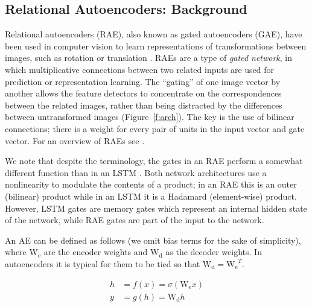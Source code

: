 \documentclass[11pt]{article}
\begin{document}
\subsection{Relational Autoencoders: Background}

Relational autoencoders (RAE), also known as gated autoencoders (GAE),
have been used in computer vision to learn representations of
transformations between images, such as rotation or translation \citep{memisevic:07,memisevic:12,memisevic:13}. RAEs
are a type of {\it gated network}, in which multiplicative connections
between two related inputs are used for prediction or representation
learning. The ``gating'' of one image vector by another allows the feature detectors to concentrate on the correspondences between the related images, rather than being distracted by the differences between untransformed images (Figure~\ref{f:arch}). The key is the use of bilinear connections; there is a weight for every pair of units in the input vector and gate vector. For an overview of RAEs see \citet{memisevic:13,sigaud:15}.

We note that despite the terminology, the gates in an RAE perform a somewhat different function than in an LSTM \citep{lstm}. Both network architectures use a nonlinearity to modulate the contents of a product; in an RAE this is an outer (bilinear) product while in an LSTM it is a Hadamard (element-wise) product. However, LSTM gates are memory gates which represent an internal hidden state of the network, while RAE gates are part of the input to the network.

An AE can be defined as follows (we omit bias terms for the sake of simplicity), where $\mathrm{W_e}$ are the encoder weights and $\mathrm{W_d}$ as the decoder weights. In autoencoders it is typical for them to be tied so that $\mathrm{W_d} = \mathrm{W_e}^T$.

\vspace{-5mm}
\begin{equation}
\begin{split}
h & = f(x) = \sigma (\mathrm{W_e}x ) \\
y & = g(h) = \mathrm{W_d}h
\end{split}
\end{equation}
\vspace{-3mm}
\end{document}
